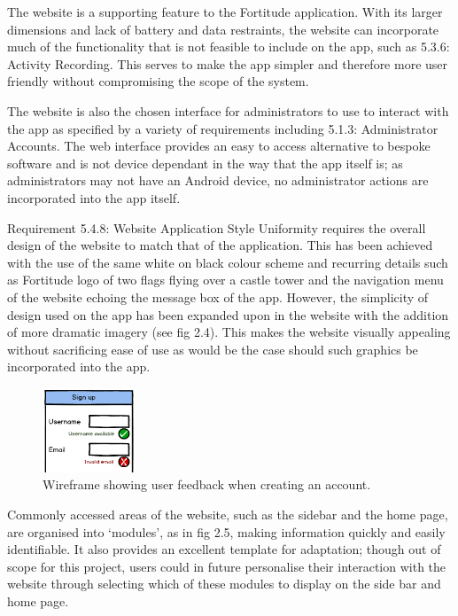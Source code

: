 The website is a supporting feature to the Fortitude application. With its larger dimensions and lack of battery and data restraints, the website can incorporate much of the functionality that is not feasible to include on the app, such as 5.3.6: Activity Recording. This serves to make the app simpler and therefore more user friendly without compromising the scope of the system.

The website is also the chosen interface for administrators to use to interact with the app as specified by a variety of requirements including 5.1.3: Administrator Accounts. The web interface provides an easy to access alternative to bespoke software and is not device dependant in the way that the app itself is; as administrators may not have an Android device, no administrator actions are incorporated into the app itself.

Requirement 5.4.8: Website Application Style Uniformity requires the overall design of the website to match that of the application. This has been achieved with the use of the same white on black colour scheme and recurring details such as Fortitude logo of two flags flying over a castle tower and the navigation menu of the website echoing the message box of the app. However, the simplicity of design used on the app has been expanded upon in the website with the addition of more dramatic imagery (see fig 2.4). This makes the website visually appealing without sacrificing ease of use as would be the case should such graphics be incorporated into the app.

\begin{figure}
	\vspace{-20pt}
	\begin{center}
	\includegraphics[width=0.25\textwidth]{images/sign_up_wireframe}
	\caption{Wireframe showing user feedback when creating an account.}
	\label{sign_up_wireframe}
	\end{center}
\end{figure}

Commonly accessed areas of the website, such as the sidebar and the home page, are organised into `modules', as in fig 2.5, making information quickly and easily identifiable. It also provides an excellent template for adaptation; though out of scope for this project, users could in future personalise their interaction with the website through selecting which of these modules to display on the side bar and home page.

